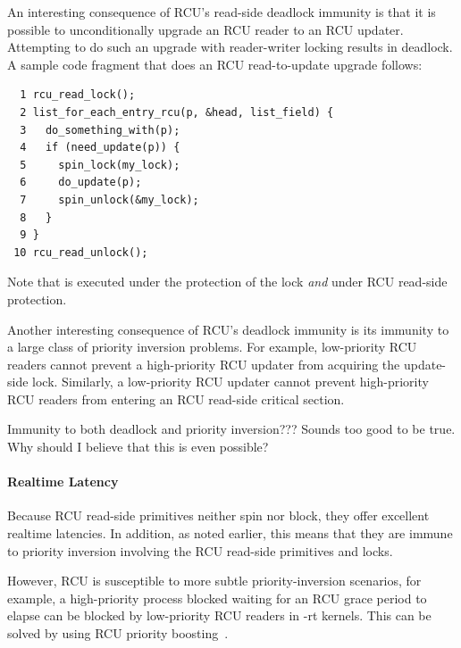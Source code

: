 An interesting consequence of RCU's read-side deadlock immunity is
that it is possible to unconditionally upgrade an RCU
reader to an RCU updater.
Attempting to do such an upgrade with reader-writer locking results
in deadlock.
A sample code fragment that does an RCU read-to-update upgrade follows:

\vspace{5pt}
\begin{minipage}[t]{\columnwidth}
\scriptsize
\begin{verbatim}
  1 rcu_read_lock();
  2 list_for_each_entry_rcu(p, &head, list_field) {
  3   do_something_with(p);
  4   if (need_update(p)) {
  5     spin_lock(my_lock);
  6     do_update(p);
  7     spin_unlock(&my_lock);
  8   }
  9 }
 10 rcu_read_unlock();
\end{verbatim}
\end{minipage}
\vspace{5pt}

Note that  is executed under
the protection of the lock \emph{and} under RCU read-side protection.

Another interesting consequence of RCU's deadlock immunity is its
immunity to a large class of priority inversion problems.
For example, low-priority RCU readers cannot prevent a high-priority
RCU updater from acquiring the update-side lock.
Similarly, a low-priority RCU updater cannot prevent high-priority
RCU readers from entering an RCU read-side critical section.

\QuickQuiz{}
	Immunity to both deadlock and priority inversion???
	Sounds too good to be true.
	Why should I believe that this is even possible?
 \QuickQuizEnd

\paragraph{Realtime Latency}

Because RCU read-side primitives neither spin nor block, they offer
excellent realtime latencies.
In addition, as noted earlier, this means that they are
immune to priority inversion
involving the RCU read-side primitives and locks.

However, RCU is susceptible to more subtle priority-inversion scenarios,
for example, a high-priority process blocked waiting for an RCU
grace period to elapse can be blocked by low-priority RCU readers
in -rt kernels.
This can be solved by using RCU priority
boosting~\cite{PaulEMcKenney2007BoostRCU,DinakarGuniguntala2008IBMSysJ}.

